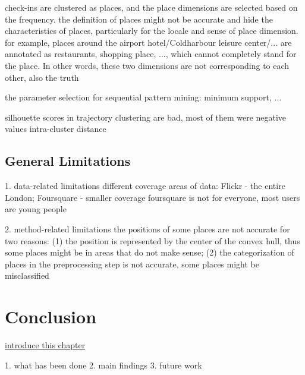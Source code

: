 \documentclass{article}
\theoremstyle{remark}
\begin{document}
check-ins are clustered as places, and the place dimensions are selected based on the frequency. the definition of places might not be accurate and hide the characteristics of places, particularly for the locale and sense of place dimension. for example, places around the airport hotel/Coldharbour leisure center/... are annotated as restaurants, shopping place, ..., which cannot completely stand for the place. In other words, these two dimensions are not corresponding to each other, also the truth


the parameter selection for sequential pattern mining: minimum support, ...

silhouette scores in trajectory clustering are bad, most of them were negative values
intra-cluster distance










\subsection{General Limitations} \label{limitations}
1. data-related limitations
different coverage areas of data: Flickr - the entire London; Foursquare - smaller coverage
foursquare is not for everyone, most users are young people

2. method-related limitations
the positions of some places are not accurate for two reasons: (1) the position is represented by the center of the convex hull, thus some places might be in areas that do not make sense; (2) the categorization of places in the preprocessing step is not accurate, some places might be misclassified




\clearpage


\section{Conclusion}
\underline{introduce this chapter}

1. what has been done
2. main findings
3. future work
\end{document}
